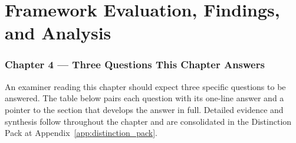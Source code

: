 
\chapter{Framework Evaluation, Findings, and Analysis}

\subsection*{Chapter 4 --- Three Questions This Chapter Answers}
\label{sec:ch4_three_questions}

\noindent An examiner reading this chapter should expect three specific questions to be answered. The table below pairs each question with its one-line answer and a pointer to the section that develops the answer in full. Detailed evidence and synthesis follow throughout the chapter and are consolidated in the Distinction Pack at Appendix~\ref{app:distinction_pack}.

